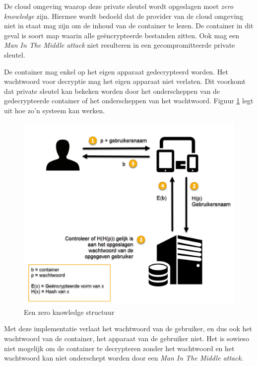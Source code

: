 De cloud omgeving waarop deze private sleutel wordt opgeslagen moet \textit{zero
knowledge} zijn. Hiermee wordt bedoeld dat de provider van de cloud omgeving
niet in staat mag zijn om de inhoud van de container te lezen. De container in
dit geval is soort map waarin alle geëncrypteerde bestanden zitten. Ook mag een
\textit{Man In The Middle attack} niet resulteren in een gecompromitteerde
private sleutel.

De container mag enkel op het eigen apparaat gedecrypteerd worden. Het
wachtwoord voor decryptie mag het eigen apparaat niet verlaten. Dit voorkomt dat
private sleutel kan bekeken worden door het onderscheppen van de gedecrypteerde
container of het onderscheppen van het wachtwoord. Figuur
\ref{fig:online-zero-knowledge-container} legt uit hoe zo’n systeem kan werken.

\begin{figure}[H]
	\includegraphics[width=\textwidth,keepaspectratio]{img/encrypted-container-sharing.png}
	\centering
	\caption{Een zero knowledge structuur}
	\label{fig:online-zero-knowledge-container}
\end{figure}

Met deze implementatie verlaat het wachtwoord van de gebruiker, en dus ook het
wachtwoord van de container, het apparaat van de gebruiker niet. Het is sowieso
niet mogelijk om de container te decrypteren zonder het wachtwoord en het
wachtwoord kan niet onderschept worden door een \textit{Man In The Middle
	attack}.

